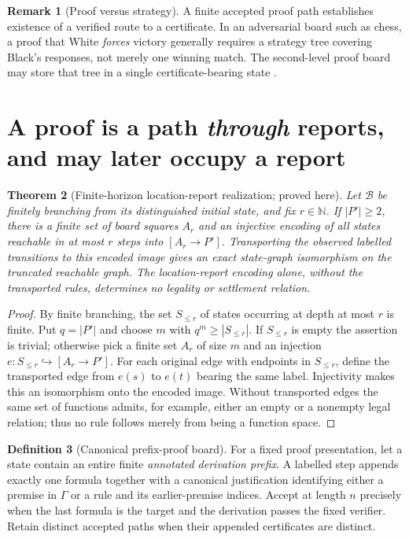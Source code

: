 \documentclass[11pt,letterpaper]{article}
\newtheorem{theorem}{Theorem}[section]
\theoremstyle{definition}
\newtheorem{definition}[theorem]{Definition}
\newtheorem{remark}[theorem]{Remark}
\newcommand{\B}{\mathcal B}
\newcommand{\Nat}{\mathbb N}
\begin{document}
\begin{remark}[Proof versus strategy]
A finite accepted proof path establishes existence of a verified route to a certificate. In an adversarial board such as chess, a proof that White \emph{forces} victory generally requires a strategy tree covering Black's responses, not merely one winning match. The second-level proof board may store that tree in a single certificate-bearing state \cite{unified}.
\end{remark}

\section{A proof is a path \emph{through} reports, and may later occupy a report}
\begin{theorem}[Finite-horizon location-report realization; proved here]\label{thm:coding}
Let $\B$ be finitely branching from its distinguished initial state, and fix $r\in\Nat$. If $|P'|\ge2$, there is a finite set of board squares $A_r$ and an injective encoding of all states reachable in at most $r$ steps into $[A_r\to P']$. Transporting the observed labelled transitions to this encoded image gives an exact state-graph isomorphism on the truncated reachable graph. The location-report encoding alone, without the transported rules, determines no legality or settlement relation.
\end{theorem}
\begin{proof}
By finite branching, the set $S_{\le r}$ of states occurring at depth at most $r$ is finite. Put $q=|P'|$ and choose $m$ with $q^m\ge |S_{\le r}|$. If $S_{\le r}$ is empty the assertion is trivial; otherwise pick a finite set $A_r$ of size $m$ and an injection $e:S_{\le r}\hookrightarrow [A_r\to P']$. For each original edge with endpoints in $S_{\le r}$, define the transported edge from $e(s)$ to $e(t)$ bearing the same label. Injectivity makes this an isomorphism onto the encoded image. Without transported edges the same set of functions admits, for example, either an empty or a nonempty legal relation; thus no rule follows merely from being a function space.
\end{proof}

\begin{definition}[Canonical prefix-proof board]
For a fixed proof presentation, let a state contain an entire finite \emph{annotated derivation prefix}. A labelled step appends exactly one formula together with a canonical justification identifying either a premise in $\Gamma$ or a rule and its earlier-premise indices. Accept at length $n$ precisely when the last formula is the target and the derivation passes the fixed verifier. Retain distinct accepted paths when their appended certificates are distinct.
\end{definition}
\end{document}
